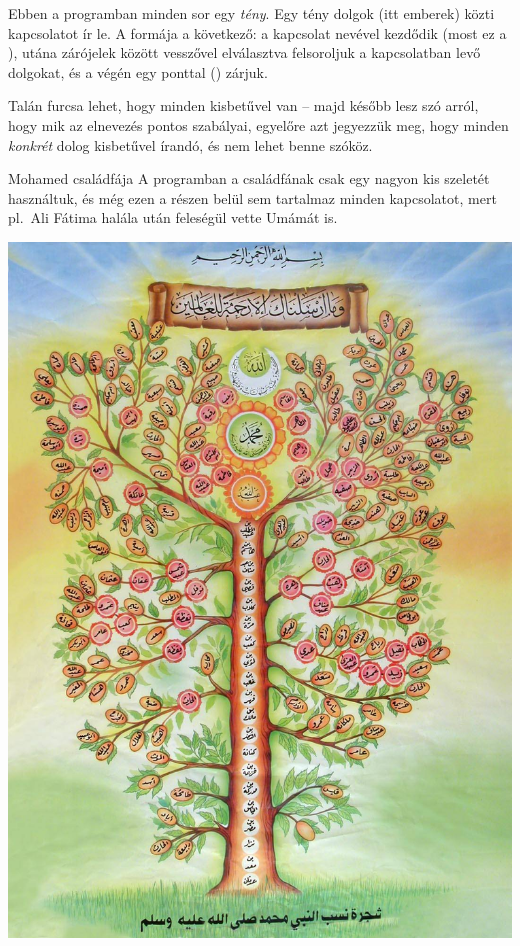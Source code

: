 Ebben a programban minden sor egy \emph{tény}. Egy
tény dolgok (itt emberek) közti kapcsolatot ír le. A
formája a következő: a kapcsolat nevével kezdődik
(most ez a ), utána zárójelek között
vesszővel elválasztva felsoroljuk a kapcsolatban
levő dolgokat, és a végén egy ponttal ()
zárjuk.

Talán furcsa lehet, hogy minden kisbetűvel van --
majd később lesz szó arról, hogy mik az elnevezés
pontos szabályai, egyelőre azt jegyezzük meg, hogy
minden \emph{konkrét} dolog kisbetűvel írandó, és
nem lehet benne szóköz.

\begin{infobox}{}{Mohamed családfája}
A programban a családfának csak egy nagyon kis
szeletét használtuk, és még ezen a részen belül
sem tartalmaz minden kapcsolatot, mert pl.~Ali
Fátima halála után feleségül vette Umámát is.

\includegraphics[width=\textwidth]{images/prophet-family.jpg}
\end{infobox}

